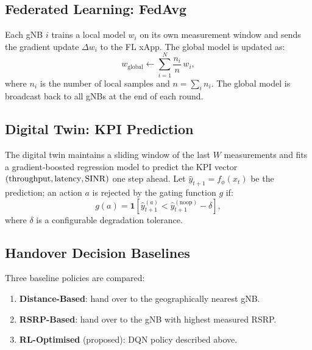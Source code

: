 \subsection{Federated Learning: FedAvg}
Each gNB $i$ trains a local model $w_i$ on its own measurement window and
sends the gradient update $\Delta w_i$ to the FL xApp.
The global model is updated as:
\begin{equation}
  w_{\text{global}} \leftarrow \sum_{i=1}^{N} \frac{n_i}{n} \, w_i,
  \label{eq:fedavg}
\end{equation}
where $n_i$ is the number of local samples and $n = \sum_i n_i$.
The global model is broadcast back to all gNBs at the end of each round.

\subsection{Digital Twin: KPI Prediction}
The digital twin maintains a sliding window of the last $W$ measurements
and fits a gradient-boosted regression model to predict the KPI vector
$({\rm throughput}, {\rm latency}, {\rm SINR})$ one step ahead.
Let $\hat{y}_{t+1} = f_\phi(x_t)$ be the prediction; an action $a$ is
rejected by the gating function $g$ if:
\begin{equation}
  g(a) = \mathbf{1}\!\left[
    \hat{y}_{t+1}^{(a)} < \hat{y}_{t+1}^{(\text{noop})} - \delta
  \right],
  \label{eq:twin_gate}
\end{equation}
where $\delta$ is a configurable degradation tolerance.

\subsection{Handover Decision Baselines}
Three baseline policies are compared:
\begin{enumerate}
  \item \textbf{Distance-Based}: hand over to the geographically nearest gNB.
  \item \textbf{RSRP-Based}: hand over to the gNB with highest measured RSRP.
  \item \textbf{RL-Optimised} (proposed): DQN policy described above.
\end{enumerate}
